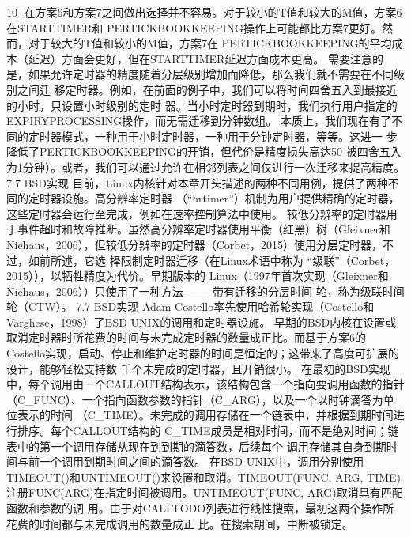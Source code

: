                                                          10
在方案6和方案7之间做出选择并不容易。对于较小的T值和较大的M值，方案6在STARTTIMER和
PERTICKBOOKKEEPING操作上可能都比方案7更好。然而，对于较大的T值和较小的M值，方案7在
PERTICKBOOKKEEPING的平均成本（延迟）方面会更好，但在STARTTIMER延迟方面成本更高。
需要注意的是，如果允许定时器的精度随着分层级别增加而降低，那么我们就不需要在不同级别之间迁
移定时器。例如，在前面的例子中，我们可以将时间四舍五入到最接近的小时，只设置小时级别的定时
器。当小时定时器到期时，我们执行用户指定的EXPIRYPROCESSING操作，而无需迁移到分钟数组。
本质上，我们现在有了不同的定时器模式，一种用于小时定时器，一种用于分钟定时器，等等。这进一
步降低了PERTICKBOOKKEEPING的开销，但代价是精度损失高达50%
被四舍五入为1分钟）。或者，我们可以通过允许在相邻列表之间仅进行一次迁移来提高精度。
7.7 BSD实现
目前，Linux内核针对本章开头描述的两种不同用例，提供了两种不同的定时器设施。高分辨率定时器
（“hrtimer”）机制为用户提供精确的定时器，这些定时器会运行至完成，例如在速率控制算法中使用。
较低分辨率的定时器用于事件超时和故障推断。虽然高分辨率定时器使用平衡（红黑）树（Gleixner和
Niehaus，2006），但较低分辨率的定时器（Corbet，2015）使用分层定时器，不过，如前所述，它选
择限制定时器迁移（在Linux术语中称为 “级联”（Corbet，2015）），以牺牲精度为代价。早期版本的
Linux（1997年首次实现（Gleixner和Niehaus，2006））只使用了一种方法 —— 带有迁移的分层时间
轮，称为级联时间轮（CTW）。
7.7 BSD实现
Adam Costello率先使用哈希轮实现（Costello和Varghese，1998）了BSD UNIX的调用和定时器设施。
早期的BSD内核在设置或取消定时器时所花费的时间与未完成定时器的数量成正比。而基于方案6的
Costello实现，启动、停止和维护定时器的时间是恒定的；这带来了高度可扩展的设计，能够轻松支持数
千个未完成的定时器，且开销很小。
在最初的BSD实现中，每个调用由一个CALLOUT结构表示，该结构包含一个指向要调用函数的指针
（C_FUNC）、一个指向函数参数的指针（C_ARG），以及一个以时钟滴答为单位表示的时间
（C_TIME）。未完成的调用存储在一个链表中，并根据到期时间进行排序。每个CALLOUT结构的
C_TIME成员是相对时间，而不是绝对时间；链表中的第一个调用存储从现在到到期的滴答数，后续每个
调用存储其自身到期时间与前一个调用到期时间之间的滴答数。
在BSD UNIX中，调用分别使用TIMEOUT()和UNTIMEOUT()来设置和取消。TIMEOUT(FUNC, ARG,
TIME)注册FUNC(ARG)在指定时间被调用。UNTIMEOUT(FUNC, ARG)取消具有匹配函数和参数的调
用。由于对CALLTODO列表进行线性搜索，最初这两个操作所花费的时间都与未完成调用的数量成正
比。在搜索期间，中断被锁定。

